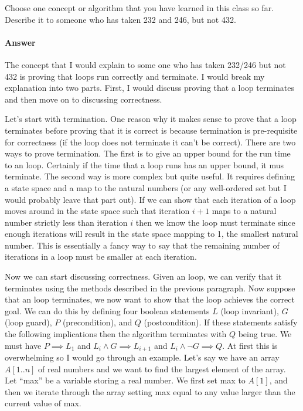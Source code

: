\documentclass{article}
\begin{document}
Choose one concept or algorithm that you have learned in this class so far.
Describe it to someone who has taken 232 and 246, but not 432.

\paragraph{Answer}


The concept that I would explain to some one who has taken 232/246 but not 432 is proving that loops run correctly and terminate.
I would break my explanation into two parts.
First, I would discuss proving that a loop terminates and then move on to discussing correctness.

Let's start with termination.
One reason why it makes sense to prove that a loop terminates before proving that it is correct is because termination is pre-requisite for correctness (if the loop does not terminate it can't be correct).
There are two ways to prove termination.
The first is to give an upper bound for the run time to an loop.
Certainly if the time that a loop runs has an upper bound, it mus terminate.
The second way is more complex but quite useful.
It requires defining a state space and a map to the natural numbers (or any well-ordered set but I would probably leave that part out).
If we can show that each iteration of a loop moves around in the state space such that iteration $i+1$ maps to a natural number strictly less than iteration $i$ then we know the loop must terminate since enough iterations will result in the state space mapping to 1, the smallest natural number.
This is essentially a fancy way to say that the remaining number of iterations in a loop must be smaller at each iteration.

Now we can start discussing correctness.
Given an loop, we can verify that it terminates using the methods described in the previous paragraph.
Now suppose that an loop terminates, we now want to show that the loop achieves the correct goal.
We can do this by defining four boolean statements $L$ (loop invariant), $G$ (loop guard), $P$ (precondition), and $Q$ (postcondition).
If these statements satisfy the following implications then the algorithm terminates with $Q$ being true.
We must have $P \implies L_1$ and $L_i \land G \implies L_{i+1}$ and $L_i \land \lnot G \implies Q$.
At first this is overwhelming so I would go through an example.
Let's say we have an array $A[1..n]$ of real numbers and we want to find the largest element of the array.
Let ``max'' be a variable storing a real number.
We first set max to $A[1]$, and then we iterate through the array setting max equal to any value larger than the current value of max.
\end{document}
